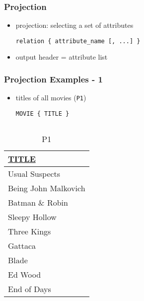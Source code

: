 \documentclass[dvipsnames]{beamer}
\theoremstyle{plain}
\begin{document}
\begin{frame}[fragile]
  \frametitle{Projection}

  \begin{itemize}
    \item \alert{projection}: selecting a set of attributes
    \begin{lstlisting}
relation { attribute_name [, ...] }
    \end{lstlisting}

    \medskip
    \item output header = attribute list
  \end{itemize}
\end{frame}

\begin{frame}[fragile]
  \frametitle{Projection Examples - 1}

  \begin{itemize}
      \item titles of all movies (\texttt{P1})
    \begin{lstlisting}
MOVIE { TITLE }
    \end{lstlisting}
  \end{itemize}

  \vspace{-10pt}
  \begin{columns}[b]
    \begin{tiny}
    \begin{table}
      \caption{P1}
      \begin{tabular}{|l|}\hline
\underline{TITLE}             \\[2pt]\hline\hline
Usual Suspects                \\\hline
Being John Malkovich          \\\hline
Batman \& Robin               \\\hline
Sleepy Hollow                 \\\hline
Three Kings                   \\\hline
Gattaca                       \\\hline
Blade                         \\\hline
Ed Wood                       \\\hline
End of Days                   \\\hline
      \end{tabular}
    \end{table}
    \end{tiny}


\end{columns}
\end{frame}
\end{document}
